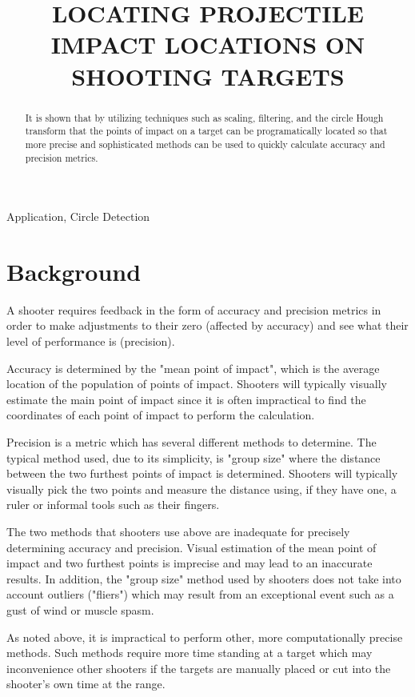 \documentclass{article}
\title{LOCATING PROJECTILE IMPACT LOCATIONS ON SHOOTING TARGETS}
\begin{document}
%
\maketitle
%
\begin{abstract}
It is shown that by utilizing techniques such as scaling, filtering, and the
circle Hough transform that the points of impact on a target can be programatically located so that
more precise and sophisticated methods can be used to quickly calculate accuracy and precision metrics.
\end{abstract}
%
\begin{keywords}
Application, Circle Detection
\end{keywords}
%
\section{Background}
\label{sec:background}
A shooter requires feedback in the form of accuracy and precision metrics in order
to make adjustments to their zero (affected by accuracy) and see what their level
of performance is (precision).

Accuracy is determined by the "mean point of impact", which is the average location
of the population of points of impact. Shooters will typically visually estimate
the main point of impact since it is often impractical to find the coordinates
of each point of impact to perform the calculation.

Precision is a metric which has several different methods to determine.
The typical method used, due to its simplicity, is "group size" where the distance
between the two furthest points of impact is determined. Shooters will typically visually
pick the two points and measure the distance using, if they have one, a ruler or
informal tools such as their fingers.

The two methods that shooters use above are inadequate for precisely determining
accuracy and precision. Visual estimation of the mean point of impact and two 
furthest points is imprecise and may lead to an inaccurate results. In addition,
the "group size" method used by shooters does not take into account outliers ("fliers")
which may result from an exceptional event such as a gust of wind or muscle spasm.

As noted above, it is impractical to perform other, more computationally precise methods.
Such methods require more time standing at a target which may inconvenience other shooters
if the targets are manually placed or cut into the shooter's own time at the range.
\end{document}
